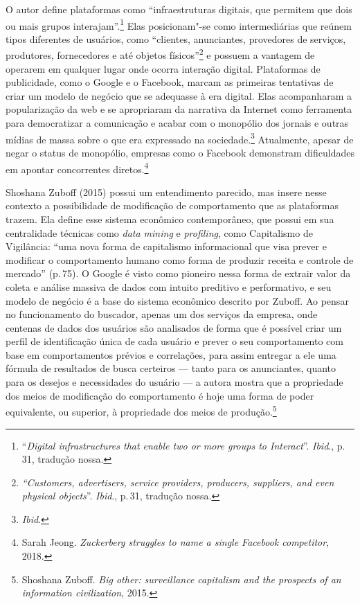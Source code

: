 O autor define plataformas como ``infraestruturas digitais, que permitem
que dois ou mais grupos interajam''.\footnote{``\emph{Digital infrastructures
  that enable two or more groups to Interact}''. \textit{Ibid}., p.\,31, tradução
nossa.} Elas posicionam"-se como intermediárias que reúnem tipos
diferentes de usuários, como ``clientes, anunciantes, provedores de
serviços, produtores, fornecedores e até objetos físicos''\footnote{\emph{``Customers,
  advertisers, service providers, producers, suppliers, and even
  physical objects}''. \textit{Ibid}., p.\,31, tradução nossa.} e possuem a vantagem
de operarem em qualquer lugar onde ocorra interação digital. Plataformas
de publicidade, como o Google e o Facebook, marcam as primeiras
tentativas de criar um modelo de negócio que se adequasse à era digital.
Elas acompanharam a popularização da web e se apropriaram da narrativa
da Internet como ferramenta para democratizar a comunicação e acabar com
o monopólio dos jornais e outras mídias de massa sobre o que era
expressado na sociedade.\footnote{\textit{Ibid}.} Atualmente, apesar de negar o
status de monopólio, empresas como o Facebook demonstram dificuldades em
apontar concorrentes diretos.\footnote{Sarah Jeong. \emph{Zuckerberg struggles to name a single Facebook competitor}, 2018.}

Shoshana Zuboff (2015) possui um entendimento parecido, mas insere nesse
contexto a possibilidade de modificação de comportamento que as
plataformas trazem. Ela define esse sistema econômico contemporâneo, que
possui em sua centralidade técnicas como \emph{data mining} e
\emph{profiling}, como Capitalismo de Vigilância: ``uma nova forma de
capitalismo informacional que visa prever e modificar o comportamento
humano como forma de produzir receita e controle de mercado'' (p.\,75). O
Google é visto como pioneiro nessa forma de extrair valor da coleta e
análise massiva de dados com intuito preditivo e performativo, e seu
modelo de negócio é a base do sistema econômico descrito por Zuboff. Ao
pensar no funcionamento do buscador, apenas um dos serviços da empresa,
onde centenas de dados dos usuários são analisados de forma que é
possível criar um perfil de identificação única de cada usuário e prever
o seu comportamento com base em comportamentos prévios e correlações,
para assim entregar a ele uma fórmula de resultados de busca certeiros
--- tanto para os anunciantes, quanto para os desejos e necessidades do
usuário --- a autora mostra que a propriedade dos meios de modificação do
comportamento é hoje uma forma de poder equivalente, ou superior, à
propriedade dos meios de produção.\footnote{Shoshana Zuboff. \emph{Big other: surveillance capitalism and the
prospects of an information civilization}, 2015.}

